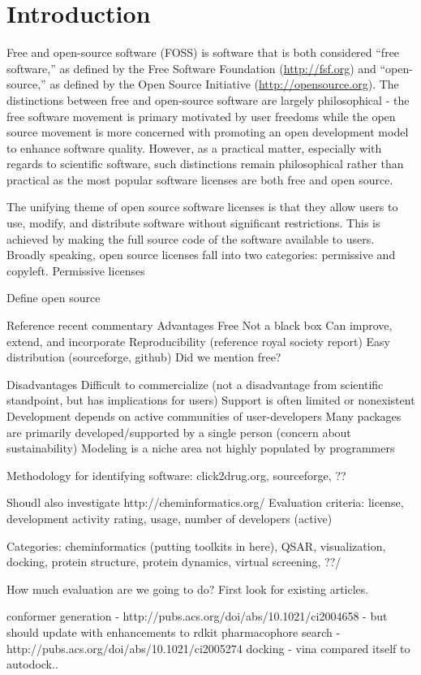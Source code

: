 \section*{Introduction}

Free and open-source software (FOSS) is software that is both considered ``free software,'' as defined by the Free Software Foundation (\url{http://fsf.org}) and ``open-source,'' as defined by the Open Source Initiative (\url{http://opensource.org}).  The distinctions between free and open-source software are largely philosophical  - the free software movement is primary motivated by user freedoms while the open source movement is more concerned with promoting an open development model to enhance software quality.  However, as a practical matter, especially with regards to scientific software, such distinctions remain philosophical rather than practical as the most popular software licenses are both free and open source.  

The unifying theme of open source software licenses is that they allow users to use, modify, and distribute software without significant restrictions.  This is achieved by making the full source code of the software available to users.  Broadly speaking, open source licenses fall into two categories: permissive and copyleft. Permissive licenses


Define open source

Reference recent commentary \cite{Karthikeyan_2014}\cite{Gezelter_2015}\cite{Krylov_2015}
Advantages 
Free
Not a black box 
Can improve, extend, and incorporate
Reproducibility (reference royal society report)
Easy distribution (sourceforge, github)
Did we mention free?

Disadvantages
Difficult to commercialize (not a disadvantage from scientific standpoint, but has implications for users)
Support is often limited or nonexistent 
Development depends on active communities of user-developers 
Many packages are primarily developed/supported by a single person (concern about sustainability)
Modeling is a niche area not highly populated by programmers

Methodology for identifying software: click2drug.org, sourceforge, ??

Shoudl also investigate http://cheminformatics.org/
Evaluation criteria: license, development activity rating, usage, number of developers (active)

Categories:
 cheminformatics (putting toolkits in here), QSAR, visualization, docking, protein structure, protein dynamics, virtual screening, ??/
 
 
 How much evaluation are we going to do?  First look for existing articles.
 
 conformer generation - http://pubs.acs.org/doi/abs/10.1021/ci2004658 - but should update with enhancements to rdkit
 pharmacophore search - http://pubs.acs.org/doi/abs/10.1021/ci2005274
 docking - vina compared itself to autodock..
  
  
  \cite{Koes_2011}
  